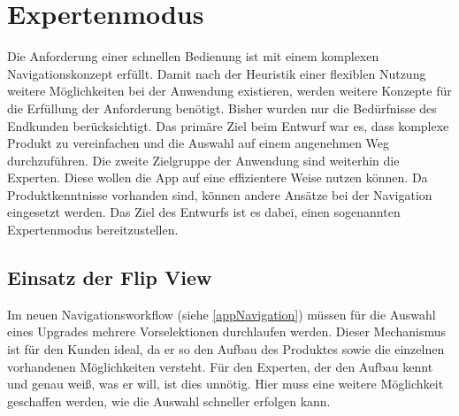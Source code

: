 \section{Expertenmodus}\label{expertDesign}
Die Anforderung einer schnellen Bedienung ist mit einem komplexen Navigationskonzept erfüllt. Damit nach der Heuristik einer flexiblen Nutzung weitere Möglichkeiten bei der Anwendung existieren, werden weitere Konzepte für die Erfüllung der Anforderung benötigt. Bisher wurden nur die Bedürfnisse des Endkunden berücksichtigt. Das primäre Ziel beim Entwurf war es, dass komplexe Produkt zu vereinfachen und die Auswahl auf einem angenehmen Weg durchzuführen. Die zweite Zielgruppe der Anwendung sind weiterhin die Experten. Diese wollen die App auf eine effizientere Weise nutzen können. Da Produktkenntnisse vorhanden sind, können andere Ansätze bei der Navigation eingesetzt werden. Das Ziel des Entwurfs ist es dabei, einen sogenannten Expertenmodus bereitzustellen.


\subsection{Einsatz der Flip View}
Im neuen Navigationsworkflow (siehe \ref{appNavigation}) müssen für die Auswahl eines Upgrades mehrere Vorselektionen durchlaufen werden. Dieser Mechanismus ist für den Kunden ideal, da er so den Aufbau des Produktes sowie die einzelnen vorhandenen Möglichkeiten versteht. Für den Experten, der den Aufbau kennt und genau weiß, was er will, ist dies unnötig. Hier muss eine weitere Möglichkeit geschaffen werden, wie die Auswahl schneller erfolgen kann. \par 

